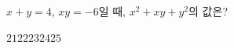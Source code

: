 $x+y=4$, $xy=-6$일 때, $x^2+xy+y^2$의 값은?
\begin{choices32}{$21$}{$22$}{$23$}{$24$}{$25$}\end{choices32}
